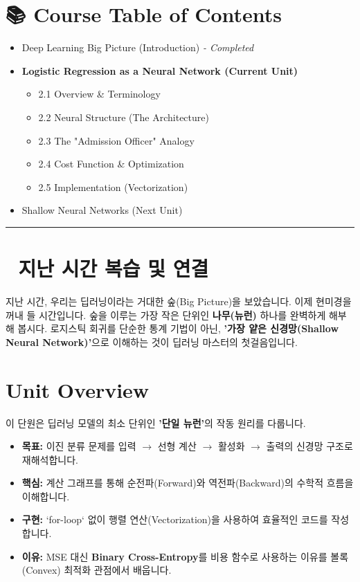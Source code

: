 \documentclass[11pt,a4paper]{book}
\theoremstyle{definition}
\begin{document}
\section*{📚 Course Table of Contents}
\begin{itemize}
    \item[Chapter 1.] Deep Learning Big Picture (Introduction) \textit{- Completed}
    \item[\textbf{Chapter 2.}] \textbf{Logistic Regression as a Neural Network (Current Unit)}
    \begin{itemize}
        \item 2.1 Overview \& Terminology
        \item 2.2 Neural Structure (The Architecture)
        \item 2.3 The "Admission Officer" Analogy
        \item 2.4 Cost Function \& Optimization
        \item 2.5 Implementation (Vectorization)
    \end{itemize}
    \item[Chapter 3.] Shallow Neural Networks (Next Unit)
\end{itemize}

\vspace{0.5cm}
\hrule
\vspace{0.5cm}

\section*{🔗 지난 시간 복습 및 연결}
지난 시간, 우리는 딥러닝이라는 거대한 숲(Big Picture)을 보았습니다. 이제 현미경을 꺼내 들 시간입니다. 숲을 이루는 가장 작은 단위인 \textbf{나무(뉴런)} 하나를 완벽하게 해부해 봅시다. 로지스틱 회귀를 단순한 통계 기법이 아닌, \textbf{'가장 얕은 신경망(Shallow Neural Network)'}으로 이해하는 것이 딥러닝 마스터의 첫걸음입니다.

\section{Unit Overview}
\begin{summarybox}[title={핵심 요약}]
이 단원은 딥러닝 모델의 최소 단위인 \textbf{'단일 뉴런'}의 작동 원리를 다룹니다.
\begin{itemize}
    \item \textbf{목표:} 이진 분류 문제를 입력 $\to$ 선형 계산 $\to$ 활성화 $\to$ 출력의 신경망 구조로 재해석합니다.
    \item \textbf{핵심:} 계산 그래프를 통해 순전파(Forward)와 역전파(Backward)의 수학적 흐름을 이해합니다.
    \item \textbf{구현:} `for-loop` 없이 행렬 연산(Vectorization)을 사용하여 효율적인 코드를 작성합니다.
    \item \textbf{이유:} MSE 대신 \textbf{Binary Cross-Entropy}를 비용 함수로 사용하는 이유를 볼록(Convex) 최적화 관점에서 배웁니다.
\end{itemize}
\end{summarybox}
\end{document}
